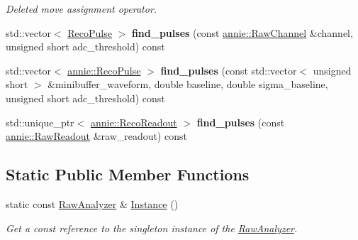 \begin{DoxyCompactItemize}
\begin{DoxyCompactList}\small\item\em Deleted move assignment operator. \item\end{DoxyCompactList}\item 
\hypertarget{classannie_1_1RawAnalyzer_ae71304d77ec7309755408850c6df2848}{
std::vector$<$ \hyperlink{classannie_1_1RecoPulse}{RecoPulse} $>$ {\bfseries find\_\-pulses} (const \hyperlink{classannie_1_1RawChannel}{annie::RawChannel} \&channel, unsigned short adc\_\-threshold) const }
\label{classannie_1_1RawAnalyzer_ae71304d77ec7309755408850c6df2848}

\item 
\hypertarget{classannie_1_1RawAnalyzer_a7a07548a1aa7a73e7fc06553ea55f885}{
std::vector$<$ \hyperlink{classannie_1_1RecoPulse}{annie::RecoPulse} $>$ {\bfseries find\_\-pulses} (const std::vector$<$ unsigned short $>$ \&minibuffer\_\-waveform, double baseline, double sigma\_\-baseline, unsigned short adc\_\-threshold) const }
\label{classannie_1_1RawAnalyzer_a7a07548a1aa7a73e7fc06553ea55f885}

\item 
\hypertarget{classannie_1_1RawAnalyzer_ad0381d0696ff97227c3c307dd42e3f3f}{
std::unique\_\-ptr$<$ \hyperlink{classannie_1_1RecoReadout}{annie::RecoReadout} $>$ {\bfseries find\_\-pulses} (const \hyperlink{classannie_1_1RawReadout}{annie::RawReadout} \&raw\_\-readout) const }
\label{classannie_1_1RawAnalyzer_ad0381d0696ff97227c3c307dd42e3f3f}

\end{DoxyCompactItemize}
\subsection*{Static Public Member Functions}
\begin{DoxyCompactItemize}
\item 
\hypertarget{classannie_1_1RawAnalyzer_a830d493693fd7c5e567b4fd592745d81}{
static const \hyperlink{classannie_1_1RawAnalyzer}{RawAnalyzer} \& \hyperlink{classannie_1_1RawAnalyzer_a830d493693fd7c5e567b4fd592745d81}{Instance} ()}
\label{classannie_1_1RawAnalyzer_a830d493693fd7c5e567b4fd592745d81}

\begin{DoxyCompactList}\small\item\em Get a const reference to the singleton instance of the \hyperlink{classannie_1_1RawAnalyzer}{RawAnalyzer}. \item\end{DoxyCompactList}\end{DoxyCompactItemize}
